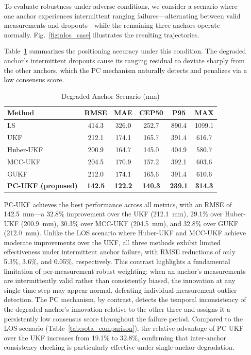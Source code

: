 \documentclass[journal]{IEEEtran}
\begin{document}
To evaluate robustness under adverse conditions, we consider a scenario where one anchor experiences intermittent ranging failures---alternating between valid measurements and dropouts---while the remaining three anchors operate normally. Fig.~\ref{fig:nlos_case} illustrates the resulting trajectories.


Table~\ref{tab:nlos_comparison} summarizes the positioning accuracy under this condition. The degraded anchor's intermittent dropouts cause its ranging residual to deviate sharply from the other anchors, which the PC mechanism naturally detects and penalizes via a low consensus score.

\begin{table}[t]
\centering
\caption{Degraded Anchor Scenario (mm)}
\label{tab:nlos_comparison}
\renewcommand{\arraystretch}{1.15}
\begin{tabular}{@{}lccccc@{}}
\toprule
\textbf{Method} & \textbf{RMSE} & \textbf{MAE} & \textbf{CEP50} & \textbf{P95} & \textbf{MAX} \\
\midrule
LS                             & 414.3 & 326.0 & 252.7 & 890.4 & 1099.1 \\
\midrule
UKF                         & 212.1 & 174.1 & 165.7 & 391.4 &  616.7 \\
Huber-UKF~\cite{huber_ukf}          & 200.9 & 164.7 & 145.0 & 404.9 &  580.7 \\
MCC-UKF~\cite{mcc_ukf}              & 204.5 & 170.9 & 157.2 & 392.1 &  603.6 \\
GUKF~\cite{gukf}                    & 212.0 & 174.1 & 165.6 & 391.4 &  610.6 \\
\textbf{PC-UKF (proposed)}           & \textbf{142.5} & \textbf{122.2} & \textbf{140.3} & \textbf{239.1} & \textbf{314.3} \\
\bottomrule
\end{tabular}
\end{table}

PC-UKF achieves the best performance across all metrics, with an RMSE of 142.5~mm---a 32.8\% improvement over the UKF (212.1~mm), 29.1\% over Huber-UKF (200.9~mm), 30.3\% over MCC-UKF (204.5~mm), and 32.8\% over GUKF (212.0~mm). Unlike the LOS scenario where Huber-UKF and MCC-UKF achieve moderate improvements over the UKF, all three methods exhibit limited effectiveness under intermittent anchor failure, with RMSE reductions of only 5.3\%, 3.6\%, and 0.05\%, respectively. This contrast highlights a fundamental limitation of per-measurement robust weighting: when an anchor's measurements are intermittently valid rather than consistently biased, the innovation at any single time step may appear normal, defeating individual-measurement outlier detection. The PC mechanism, by contrast, detects the temporal inconsistency of the degraded anchor's innovation relative to the other three and assigns it a persistently low consensus score throughout the failure period. Compared to the LOS scenario (Table~\ref{tab:sota_comparison}), the relative advantage of PC-UKF over the UKF increases from 19.1\% to 32.8\%, confirming that inter-anchor consistency checking is particularly effective under single-anchor degradation.
\end{document}
